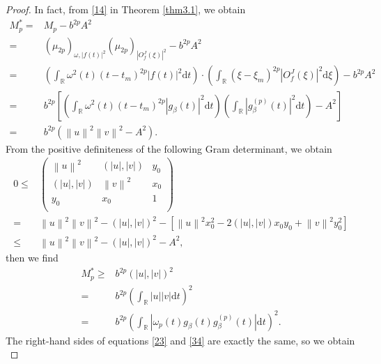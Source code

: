 \documentclass[10pt,a4paper]{amsart}
\begin{document}
\begin{proof}
	In fact, from \eqref{14} in Theorem \ref{thm3.1}, we obtain
	\begin{align}
	\label{32}
	M_p^* =& M_p -b^{2p} A^2 \nonumber\\
	=&(\mu_{2p})_{\omega,\left|f(t) \right|^2}(\mu_{2p})_{\left| O_f^J(\xi) \right|^2} - b^{2p} A^2 \nonumber\\
	=&\left( \int_{\mathbb{R}} \omega^2(t) (t-t_m)^{2p} \left|f(t) \right|^2 \mathrm{d}t \right) \cdot \left( \int_{\mathbb{R}} (\xi-\xi_m)^{2p} \left|O_f^J(\xi) \right|^2 \mathrm{d}\xi \right) -b^{2p} A^2 \nonumber\\
	=&b^{2p} \left[ \left( \int_{\mathbb{R}} \omega^2(t) (t-t_m)^{2p} \left| g_{\beta}(t) \right|^2 \mathrm{d}t \right) \left( \int_{\mathbb{R}} \left| g_{\beta}^{(p)} (t) \right| ^2 \mathrm{d}t \right) -A^2 \right]  \nonumber\\
	=&b^{2p} \left( \left\|u\right\|^2 \left\|v\right\|^2 -A^2 \right).
	\end{align} 
	From the positive definiteness of the following Gram determinant, we obtain
	\begin{align*}
	0 \leq &\begin{pmatrix}
	\left\|u\right\|^2&(\left|u\right|,\left|v\right|)&y_0\\
	(\left|u\right|,\left|v\right|)&\left\|v\right\|^2&x_0\\
	y_0&x_0&1\\
	\end{pmatrix} \nonumber \\
	=&\left\|u\right\|^2 \left\|v\right\|^2-(\left|u\right|,\left|v\right|)^2-\left[\left\|u\right\|^2 x_0^2 -2(\left|u\right|,\left|v\right|)x_0y_0+\left\|v\right\|^2y_0^2 \right] \nonumber \\
	\leq &\left\|u\right\|^2 \left\|v\right\|^2-(\left|u\right|,\left|v\right|)^2-A^2,
	\end{align*}
	then we find
	\begin{align}
	\label{34}
	M_p^* \ge& b^{2p}(\left|u \right|,\left|v \right|)^2 \nonumber \\
	=&b^{2p} \left( \int_{\mathbb{R}} \left|u \right| \left|v \right| \mathrm{d}t \right)^2  \nonumber\\
	=&b^{2p}  \left( \int_{\mathbb{R}} \left|\omega_p(t) g_{\beta}(t) g_{\beta}^{(p)} (t) \right| \mathrm{d}t \right)^2.
	\end{align}
	The right-hand sides of equations \eqref{23} and \eqref{34} are exactly the same, so we obtain
	\begin{equation}

\end{equation}
\end{proof}
\end{document}
